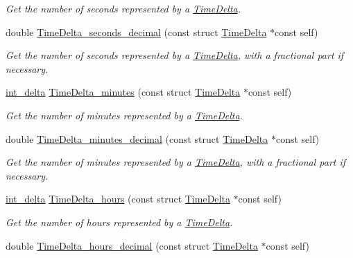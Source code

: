 \begin{DoxyCompactItemize}
\begin{DoxyCompactList}\small\item\em Get the number of seconds represented by a \hyperlink{structTimeDelta}{Time\-Delta}. \end{DoxyCompactList}\item 
double \hyperlink{time-delta_8h_ae4690765e21818a97d80b5e5f4334e73}{Time\-Delta\-\_\-seconds\-\_\-decimal} (const struct \hyperlink{structTimeDelta}{Time\-Delta} $\ast$const self)
\begin{DoxyCompactList}\small\item\em Get the number of seconds represented by a \hyperlink{structTimeDelta}{Time\-Delta}, with a fractional part if necessary. \end{DoxyCompactList}\item 
\hyperlink{types_8h_a8a67cf99971c5cfeeaa2380ba84a4c92}{int\-\_\-delta} \hyperlink{time-delta_8h_a561b203a50b7386cd1076e05f98eb488}{Time\-Delta\-\_\-minutes} (const struct \hyperlink{structTimeDelta}{Time\-Delta} $\ast$const self)
\begin{DoxyCompactList}\small\item\em Get the number of minutes represented by a \hyperlink{structTimeDelta}{Time\-Delta}. \end{DoxyCompactList}\item 
double \hyperlink{time-delta_8h_ae77d3ff682af80dff0e2d601143c4bd7}{Time\-Delta\-\_\-minutes\-\_\-decimal} (const struct \hyperlink{structTimeDelta}{Time\-Delta} $\ast$const self)
\begin{DoxyCompactList}\small\item\em Get the number of minutes represented by a \hyperlink{structTimeDelta}{Time\-Delta}, with a fractional part if necessary. \end{DoxyCompactList}\item 
\hyperlink{types_8h_a8a67cf99971c5cfeeaa2380ba84a4c92}{int\-\_\-delta} \hyperlink{time-delta_8h_aaf78ae5ac19ba90ef26ff6cfc89ea734}{Time\-Delta\-\_\-hours} (const struct \hyperlink{structTimeDelta}{Time\-Delta} $\ast$const self)
\begin{DoxyCompactList}\small\item\em Get the number of hours represented by a \hyperlink{structTimeDelta}{Time\-Delta}. \end{DoxyCompactList}\item 
double \hyperlink{time-delta_8h_ab3eac32bcfa848e984b2d3d2fb48f2f3}{Time\-Delta\-\_\-hours\-\_\-decimal} (const struct \hyperlink{structTimeDelta}{Time\-Delta} $\ast$const self)

\end{DoxyCompactItemize}
